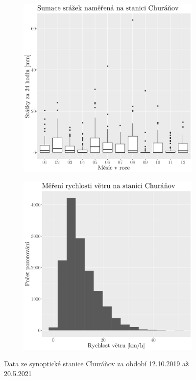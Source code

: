 \begin{figure}
\begin{subfigure}{0.45\textwidth}
		\caption{}
		\label{fig:synop_snowcm}
	\end{subfigure}
	\hfill
	\begin{subfigure}{0.45\textwidth}
  \includegraphics[width=\textwidth]{img/synop_prec.png}
		\caption{}
		\label{fig:synop_prec}
	\end{subfigure}
	\hfill
	\begin{subfigure}{0.45\textwidth}
  \includegraphics[width=\textwidth]{img/synop_ffkmh.png}
		\caption{}
		\label{fig:synop_ffkmh}
	\end{subfigure}
	\caption{Data ze synoptické stanice Churáňov za období 12.10.2019 až 20.5.2021} 
	\label{fig:chmuukazka}
\end{figure}

